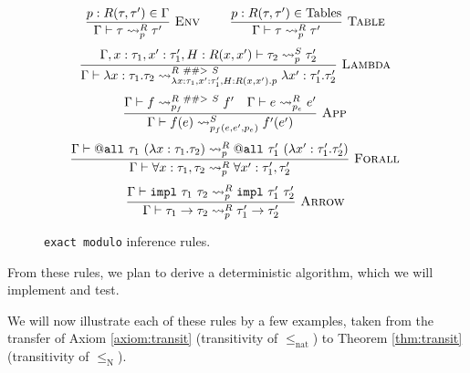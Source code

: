 \documentclass{llncs}
\begin{document}
\begin{figure}
    \[
        \frac{
            p : R(\tau,\tau') \in \mathrm{\Gamma}
        }{
            \mathrm{\Gamma} \vdash
            \tau \leadsto^R_{p} \tau'
        } \mbox{ \textsc{Env} }
        \qquad
        \frac{
            p : R(\tau,\tau') \in \mathrm{Tables}
        }{
            \mathrm{\Gamma} \vdash
            \tau \leadsto^R_{p} \tau'
        } \mbox{ \textsc{Table} }
    \]
    \[
        \frac{
            \mathrm{\Gamma}, x : \tau_1, x' : \tau'_1, H : R(x,x') \vdash
            \tau_2 \leadsto^S_{p} \tau'_2
        }{
            \mathrm{\Gamma} \vdash
            \mathrm{\lambda} x : \tau_1. \tau_2
            \leadsto^{
                R~\#\#>~S
            }_{
                \mathrm{\lambda} x : \tau_1, x' : \tau'_1, H : R(x,x'). p
            }
            \mathrm{\lambda} x' : \tau'_1. \tau'_2
        } \mbox{ \textsc{Lambda} }
    \]
    \[
        \frac{
            \mathrm{\Gamma} \vdash
            f \leadsto^{R~\#\#>~S}_{p_f} f'
            \quad
            \mathrm{\Gamma} \vdash
            e \leadsto^{R}_{p_e} e'
        }{
            \mathrm{\Gamma} \vdash
            f(e) \leadsto^S_{p_f(e, e', p_e)} f'(e')
        } \mbox{ \textsc{App} }
    \]
    \[
        \frac{
            \mathrm{\Gamma} \vdash
            \mathtt{@all}~\tau_1~(\mathrm{\lambda} x : \tau_1. \tau_2)
            \leadsto^R_p
            \mathtt{@all}~\tau'_1~(\mathrm{\lambda} x' : \tau'_1. \tau'_2)
        }{
            \mathrm{\Gamma} \vdash
            \forall x : \tau_1, \tau_2 \leadsto^R_p
            \forall x' : \tau'_1, \tau'_2
        } \mbox{ \textsc{Forall} }
    \]
    \[
        \frac{
            \mathrm{\Gamma} \vdash
            \mathtt{impl}~\tau_1~\tau_2 \leadsto^R_p
            \mathtt{impl}~\tau'_1~\tau'_2
        }{
            \mathrm{\Gamma} \vdash
            \tau_1 \rightarrow \tau_2 \leadsto^R_p
            \tau'_1 \rightarrow \tau'_2
        } \mbox{ \textsc{Arrow} }
    \]
    \caption{\texttt{exact modulo} inference rules.}
    \label{fig:rules}
\end{figure}

From these rules, we plan to derive a deterministic algorithm,
which we will implement and test.

We will now illustrate each of these rules by a few examples,
taken from the transfer of Axiom \ref{axiom:transit}
(transitivity of $\leq_{\mathrm{nat}}$)
to Theorem \ref{thm:transit} (transitivity of $\leq_{\mathrm{N}}$).
\end{document}
